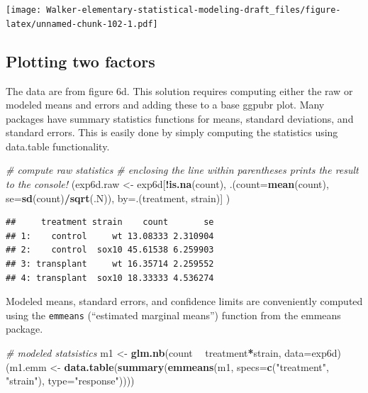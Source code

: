 \documentclass[]{book}
\newenvironment{Shaded}{\begin{snugshade}}{\end{snugshade}}
\newcommand{\CommentTok}[1]{\textcolor[rgb]{0.56,0.35,0.01}{\textit{#1}}}
\newcommand{\DataTypeTok}[1]{\textcolor[rgb]{0.13,0.29,0.53}{#1}}
\newcommand{\KeywordTok}[1]{\textcolor[rgb]{0.13,0.29,0.53}{\textbf{#1}}}
\newcommand{\NormalTok}[1]{#1}
\newcommand{\OperatorTok}[1]{\textcolor[rgb]{0.81,0.36,0.00}{\textbf{#1}}}
\newcommand{\StringTok}[1]{\textcolor[rgb]{0.31,0.60,0.02}{#1}}
\begin{document}
\texttt{[image: Walker-elementary-statistical-modeling-draft\_files/figure-latex/unnamed-chunk-102-1.pdf]}

\hypertarget{plotting-two-factors}{%
\subsection{Plotting two factors}\label{plotting-two-factors}}

The data are from figure 6d. This solution requires computing either the raw or modeled means and errors and adding these to a base ggpubr plot. Many packages have summary statistics functions for means, standard deviations, and standard errors. This is easily done by simply computing the statistics using data.table functionality.

\begin{Shaded}
\begin{Highlighting}[]
\CommentTok{# compute raw statistics}
\CommentTok{# enclosing the line within parentheses prints the result to the console!}
\NormalTok{(exp6d.raw <-}\StringTok{ }\NormalTok{exp6d[}\OperatorTok{!}\KeywordTok{is.na}\NormalTok{(count), .(}\DataTypeTok{count=}\KeywordTok{mean}\NormalTok{(count),}
                       \DataTypeTok{se=}\KeywordTok{sd}\NormalTok{(count)}\OperatorTok{/}\KeywordTok{sqrt}\NormalTok{(.N)),}
                   \DataTypeTok{by=}\NormalTok{.(treatment, strain)]}
\NormalTok{)}
\end{Highlighting}
\end{Shaded}

\begin{verbatim}
##     treatment strain    count       se
## 1:    control     wt 13.08333 2.310904
## 2:    control  sox10 45.61538 6.259903
## 3: transplant     wt 16.35714 2.259552
## 4: transplant  sox10 18.33333 4.536274
\end{verbatim}

Modeled means, standard errors, and confidence limits are conveniently computed using the \texttt{emmeans} (``estimated marginal means'') function from the emmeans package.

\begin{Shaded}
\begin{Highlighting}[]
\CommentTok{# modeled statsistics}
\NormalTok{m1 <-}\StringTok{ }\KeywordTok{glm.nb}\NormalTok{(count }\OperatorTok{~}\StringTok{ }\NormalTok{treatment}\OperatorTok{*}\NormalTok{strain, }\DataTypeTok{data=}\NormalTok{exp6d)}
\NormalTok{(m1.emm <-}\StringTok{ }\KeywordTok{data.table}\NormalTok{(}\KeywordTok{summary}\NormalTok{(}\KeywordTok{emmeans}\NormalTok{(m1, }\DataTypeTok{specs=}\KeywordTok{c}\NormalTok{(}\StringTok{"treatment"}\NormalTok{, }\StringTok{"strain"}\NormalTok{), }\DataTypeTok{type=}\StringTok{"response"}\NormalTok{))))}
\end{Highlighting}
\end{Shaded}
\end{document}
